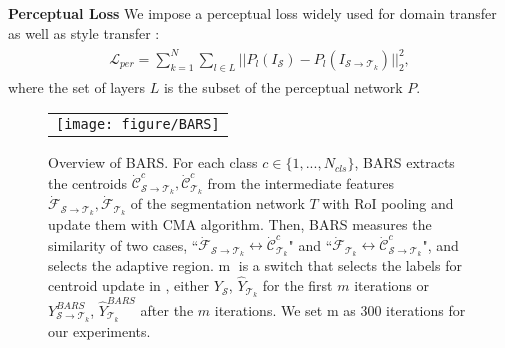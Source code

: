 \noindent\textbf{Perceptual Loss}
We impose a perceptual loss \cite{johnson2016perceptual} widely used for domain transfer as well as style transfer \cite{dumoulin2016learned, huang2017arbitrary}:
\begin{gather}
\begin{split}
    \mathcal{L}_{per} = \sum_{k=1}^{N} \sum_{l \in L} || P_l(I_{\mathcal{S}}) - P_l(I_{\mathcal{S} \to {\mathcal{T}_k}}) ||_2^2,
\end{split}
\label{eq:per}
\end{gather}
where the set of layers $L$ is the subset of the perceptual network $P$.





\begin{figure}[t] 
	\centering
	\begin{tabular}{c}
    \texttt{[image: figure/BARS]} 
    \end{tabular}
	\caption{Overview of BARS.
	For each class $c\in \{1,...,N_{cls} \}$,
	BARS extracts the centroids $\dot{\mathcal{C}}^{c}_{\mathcal{S}\to{\mathcal{T}_k}}, \dot{\mathcal{C}}^{c}_{\mathcal{T}_k}$ from the intermediate features $\dot{\mathcal{F}}_{\mathcal{S}\to{\mathcal{T}_k}}, \dot{\mathcal{F}}_{\mathcal{T}_k} $ of the segmentation network $T$ with RoI pooling and update them with CMA algorithm.
	Then, BARS measures the similarity of two cases, ``$\dot{\mathcal{F}}_{\mathcal{S}\to{\mathcal{T}_k}}\leftrightarrow \dot{\mathcal{C}}_{\mathcal{T}_k}^c$" and ``$\dot{\mathcal{F}}_{\mathcal{T}_k}\leftrightarrow \dot{\mathcal{C}}_{\mathcal{S}\to{\mathcal{T}_k}}^c$", and selects the adaptive region.
	\textcircled{m} is a switch that selects the labels for centroid update in , either $Y_\mathcal{S}$, $\hat{Y}_{\mathcal{T}_k}$ for the first $m$ iterations or $Y^{BARS}_{\mathcal{S}\to{\mathcal{T}_k}}$, $\hat{Y}^{BARS}_{\mathcal{T}_k}$ after the $m$ iterations. We set m as 300 iterations for our experiments.
	}
\label{fig:BARS}
	\vspace{-3mm}
\end{figure}









